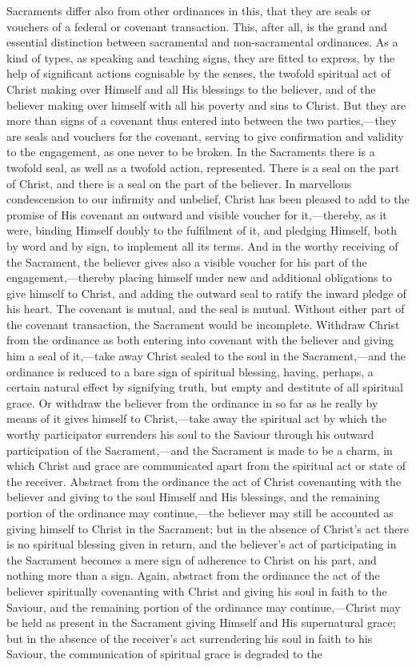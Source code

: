 \documentclass[]{book}
\begin{document}
Sacraments differ also from other ordinances in this, that they are seals or vouchers of a federal or covenant transaction. This, after all, is the grand and essential distinction between sacramental and non-sacramental ordinances. As a kind of types, as speaking and teaching signs, they are fitted to express, by the help of significant actions cognisable by the senses, the twofold spiritual act of Christ making over Himself and all His blessings to the believer, and of the believer making over himself with all his poverty and sins to Christ. But they are more than signs of a covenant thus entered into between the two parties,---they are seals and vouchers for the covenant, serving to give confirmation and validity to the engagement, as one never to be broken. In the Sacraments there is a twofold seal, as well as a twofold action, represented. There is a seal on the part of Christ, and there is a seal on the part of the believer. In marvellous condescension to our infirmity and unbelief, Christ has been pleased to add to the promise of His covenant an outward and visible voucher for it,---thereby, as it were, binding Himself doubly to the fulfilment of it, and pledging Himself, both by word and by sign, to implement all its terms. And in the worthy receiving of the Sacrament, the believer gives also a visible voucher for his part of the engagement,---thereby placing himself under new and additional obligations to give himself to Christ, and adding the outward seal to ratify the inward pledge of his heart. The covenant is mutual, and the seal is mutual. Without either part of the covenant transaction, the Sacrament would be incomplete. Withdraw Christ from the ordinance as both entering into covenant with the believer and giving him a seal of it,---take away Christ sealed to the soul in the Sacrament,---and the ordinance is reduced to a bare sign of spiritual blessing, having, perhaps, a certain natural effect by signifying truth, but empty and destitute of all spiritual grace. Or withdraw the believer from the ordinance in so far as he really by means of it gives himself to Christ,---take away the spiritual act by which the worthy participator surrenders his soul to the Saviour through his outward participation of the Sacrament,---and the Sacrament is made to be a charm, in which Christ and grace are communicated apart from the spiritual act or state of the receiver. Abstract from the ordinance the act of Christ covenanting with the believer and giving to the soul Himself and His blessings, and the remaining portion of the ordinance may continue,---the believer may still be accounted as giving himself to Christ in the Sacrament; but in the absence of Christ's act there is no spiritual blessing given in return, and the believer's act of participating in the Sacrament becomes a mere sign of adherence to Christ on his part, and nothing more than a sign. Again, abstract from the ordinance the act of the believer spiritually covenanting with Christ and giving his soul in faith to the Saviour, and the remaining portion of the ordinance may continue,---Christ may be held as present in the Sacrament giving Himself and His supernatural grace; but in the absence of the receiver's act surrendering his soul in faith to his Saviour, the communication of spiritual grace is degraded to the 
\end{document}
